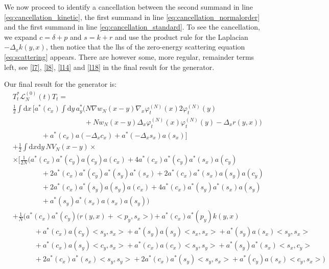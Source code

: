 \documentclass[11pt,a4paper,draft,DIV11]{scrartcl}	%
\newcommand{\di}{\textrm{d}}		%
\newcommand{\Lcal}{\mathcal{L}}		%
\newcommand{\scal}[2]{\big<#1,#2\big>} %
\newcommand{\ph}{\varphi_t^{(N)}}	%
\newcommand{\eqr}[1]{\eqref{eq:#1}}			%
\begin{document}
We now proceed to identify a cancellation between the second summand in line \eqr{cancellation_kinetic}, the first summand in line \eqr{cancellation_normalorder} and the first summand in line \eqr{cancellation_standard}. To see the cancellation, we expand $c = \delta + p$ and $s = k + r$ and use the product rule for the Laplacian $-\Delta_x k(y,x)$, then notice that the lhs of the zero-energy scattering equation \eqr{scattering} appears. There are however some, more regular, remainder terms left, see \eqref{l7}, \eqref{l8}, \eqref{l14} and \eqref{l18} in the final result for the generator.

Our final result for the generator is:
\begin{align}
& T^*_t \Lcal_N^{(0)}(t) T_t = \nonumber \\ 
& \frac{1}{2} \int \di x\, \bigg[ a^*(c_x) \int \di y\, a^*_y \Big( N \nabla w_N(x-y) \nabla_x \ph(x) 2 \ph(y) \label{l7}\\
& \qquad\qquad \qquad\qquad \qquad	+ Nw_N(x-y) \Delta_x \ph(x) \ph(y) - \Delta_x r(y,x) \Big) \label{l8}\\
& \qquad\qquad 			+ a^*(c_x) a(-\Delta_x c_x) + a^*(-\Delta_x s_x) a(s_x) \bigg] \label{l9} \\
& + \frac{1}{2}\int \di x \di y\, NV_N(x-y) \times \nonumber \\
& \times \Big[   \frac{1}{2N}\bigg( a^*(c_x) a^*(c_y) a(c_y) a(c_x) + 4 a^*(c_x) a^*(c_y) a^*(s_x) a(c_y) \label{l10}\\
				      & \qquad\qquad + 2 a^*(c_x) a^*(c_y) a^*(s_y) a^*(s_x) + 2 a^*(c_x) a^*(s_x) a(s_y) a(c_y) \label{l11}\\
				      & \qquad\qquad + 2 a^*(c_x) a^*(s_y) a(s_y) a(c_x) + 4 a^*(c_x) a^*(s_y) a^*(s_x) a(s_y) \label{l12}\\
				      & \qquad\qquad + a^*(s_y) a^*(s_x) a(s_x) a(s_y) \bigg) \label{l13}\\
& + \frac{1}{N}\bigg(   a^*(c_x) a^*(c_y) \Big( r(y,x) + \scal{p_y}{s_x} \Big) + a^*(c_x) a^*(p_y) k(y,x) \label{l14} \\
      & \qquad\quad + a^*(c_x) a(c_y) \scal{s_y}{s_x} + a^*(s_y) a(s_y) \scal{s_x}{s_x} + a^*(s_y) a(s_x) \scal{s_y}{s_x} \label{l15}\\
      & \qquad\quad + a^*(c_x) a(s_y) \scal{c_y}{s_x} + a^*(c_x) a(c_x) \scal{s_y}{s_y} + a^*(s_y) a^*(s_x) \scal{s_x}{c_y} \label{l16}\\
      & \qquad\quad + 2a^*(c_x) a^*(s_x) \scal{s_y}{s_y} + 2a^*(c_x)a^*(s_y) \scal{s_y}{s_x} + a^*(c_y) a(s_x) \scal{c_y}{s_x}    \bigg) \label{l17}\\

\end{align}
\end{document}
